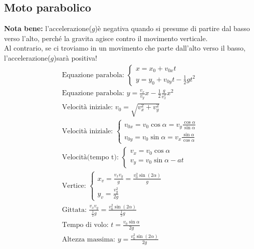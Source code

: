 \subsection{Moto parabolico}
\textbf{Nota bene: } l'accelerazione($g$)è negativa quando si presume di partire dal basso verso l'alto, perché la gravita agisce contro il movimento verticale. \\ Al contrario, se ci troviamo in un movimento che parte dall'alto verso il basso, l'accelerazione($g$)sarà positiva!
\begin{gather*}
\text{Equazione parabola: } \begin{cases}
    x = x_0 + v_{0x} t \\
    y = y_0 + v_{0y} t - \frac{1}{2} g t^2
\end{cases}
\\
\text{Equazione parabola: } y = \frac{v_x}{v_y} x - \frac{1}{2} \frac{g}{v_x^2} x^2 \\
\text{Velocità iniziale: } v_0 = \sqrt{v_x^2 + v_y^2} \\
\text{Velocità iniziale: } \begin{cases}
    v_{0x} = v_0 \cos \alpha  = v_y \frac{\cos \alpha}{\sin \alpha} \\
    v_{0y} = v_0 \sin \alpha = v_x \frac{\sin \alpha }{\cos \alpha}
\end{cases}
\\
\text{Velocità(tempo t): } \begin{cases}
    v_x = v_0 \cos \alpha \\
    v_y = v_0 \sin \alpha - a t
\end{cases}
\\
\text{Vertice: } \begin{cases}
    x_v = \frac{v_x v_y}{g} = \frac{v_0^2 \sin (2\alpha)}{g} \\
    y_v = \frac{v_y^2}{2g}
\end{cases}
\\
\text{Gittata: } \frac{v_x v_y}{\frac{1}{2}g} = \frac{v_0^2 \sin (2 \alpha)}{\frac{1}{2}g} \\
\text{Tempo di volo: } t = \frac{v_0 \sin \alpha}{2g} \\
\text{Altezza massima: } y = \frac{v_0^2 \sin (2 \alpha)}{2g}
\end{gather*}


